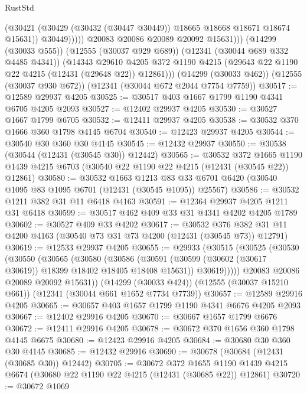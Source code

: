 \begin{lexlean}{RustStd}
\begin{coremodule}
                      (@30421 (@30429 (@30432 (@30447 @30449)) @18665 @18668 @18671 @18674 @15631))
                      @30449)))))
            @20083
            @20086
            @20089
            @20092
            @15631)))
      (@14299 (@30033 @555))
      (@12555 (@30037 @929 @689))
      (@12341 (@30044 @689 @332 @4485 @4341))
      (@14343
        @29610
        @4205
        @372
        @1190
        @4215
        (@29643 @22 @1190 @22 @4215 (@12431 (@29648 @22)) @12861)))
    (@14299 (@30033 @462))
    (@12555 (@30037 @930 @672))
    (@12341 (@30044 @672 @2044 @7754 @7759))
@30517 := @12589 @29937 @4205
@30525 := @30517 @403 @1667 @1799 @1190 @4341 @6705 @4205 @2093
@30527 := @12402 @29937 @4205
@30530 := @30527 @1667 @1799 @6705
@30532 := @12411 @29937 @4205
@30538 := @30532 @370 @1666 @360 @1798 @4145 @6704
@30540 := @12423 @29937 @4205
@30544 := @30540 @30 @360 @30 @4145
@30545 := @12432 @29937
@30550 := @30538 (@30544 (@12431 (@30545 @30)) @12442)
@30565 := @30532
    @372
    @1665
    @1190
    @1439
    @4215
    @6703
    (@30540 @22 @1190 @22 @4215 (@12431 (@30545 @22)) @12861)
@30580 := @30532
    @1663
    @1213
    @83
    @33
    @6701
    @6420
    (@30540 @1095 @83 @1095 @6701 (@12431 (@30545 @1095)) @25567)
@30586 := @30532 @1211 @382 @31 @11 @6418 @4163
@30591 := @12364 @29937 @4205 @1211 @31 @6418
@30599 := @30517 @462 @409 @33 @31 @4341 @4202 @4205 @1789
@30602 := @30527 @409 @33 @4202
@30617 := @30532
    @376
    @382
    @31
    @11
    @4200
    @4163
    (@30540 @73 @31 @73 @4200 (@12431 (@30545 @73)) @12791)
@30619 := @12533 @29937 @4205
@30655 := @29933
    (@30515
      (@30525
        (@30530
          (@30550
            (@30565
              (@30580
                (@30586
                  (@30591 (@30599 (@30602 (@30617 @30619)) @18399 @18402 @18405 @18408 @15631))
                  @30619)))))
        @20083
        @20086
        @20089
        @20092
        @15631))
    (@14299 (@30033 @424))
    (@12555 (@30037 @15210 @661))
    (@12341 (@30044 @661 @1652 @7734 @7739))
@30657 := @12589 @29916 @4205
@30665 := @30657 @403 @1657 @1799 @1190 @4341 @6676 @4205 @2093
@30667 := @12402 @29916 @4205
@30670 := @30667 @1657 @1799 @6676
@30672 := @12411 @29916 @4205
@30678 := @30672 @370 @1656 @360 @1798 @4145 @6675
@30680 := @12423 @29916 @4205
@30684 := @30680 @30 @360 @30 @4145
@30685 := @12432 @29916
@30690 := @30678 (@30684 (@12431 (@30685 @30)) @12442)
@30705 := @30672
    @372
    @1655
    @1190
    @1439
    @4215
    @6674
    (@30680 @22 @1190 @22 @4215 (@12431 (@30685 @22)) @12861)
@30720 := @30672
    @1069

\end{coremodule}
\end{lexlean}
